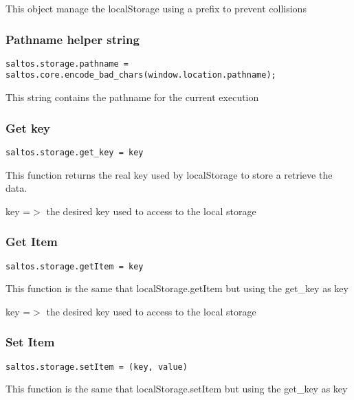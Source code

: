 \documentclass[a4paper]{article}
\begin{document}
This object manage the localStorage using a prefix to prevent collisions

\hypertarget{toc846}{}
\subsubsection{Pathname helper string}

\begin{lstlisting}
saltos.storage.pathname = saltos.core.encode_bad_chars(window.location.pathname);
\end{lstlisting}

This string contains the pathname for the current execution

\hypertarget{toc847}{}
\subsubsection{Get key}

\begin{lstlisting}
saltos.storage.get_key = key
\end{lstlisting}

This function returns the real key used by localStorage to store a retrieve
the data.

key =$>$ the desired key used to access to the local storage

\hypertarget{toc848}{}
\subsubsection{Get Item}

\begin{lstlisting}
saltos.storage.getItem = key
\end{lstlisting}

This function is the same that localStorage.getItem but using the get\_key as key

key =$>$ the desired key used to access to the local storage

\hypertarget{toc849}{}
\subsubsection{Set Item}

\begin{lstlisting}
saltos.storage.setItem = (key, value)
\end{lstlisting}

This function is the same that localStorage.setItem but using the get\_key as key
\end{document}
